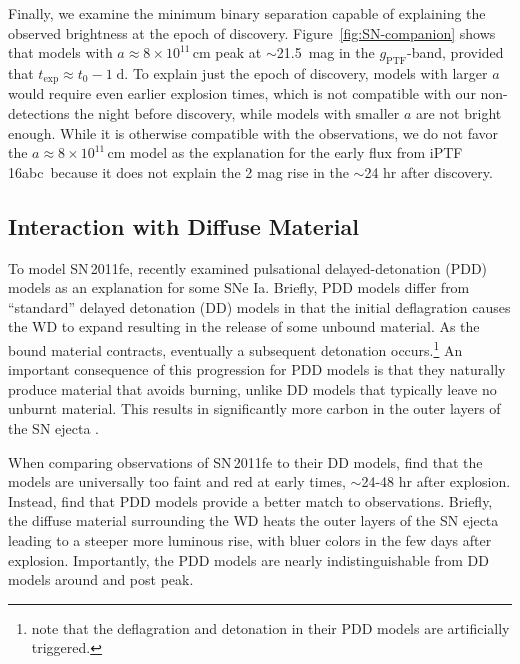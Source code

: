 \documentclass[twocolumn]{aastex61}
\newcommand{\abc}{iPTF\,16abc}
\begin{document}
Finally, we examine the minimum binary separation capable of explaining the observed brightness at the epoch of discovery. Figure~\ref{fig:SN-companion} shows that models with $a \approx 8 \times 10^{11} \, \mathrm{cm}$ peak at $\sim$21.5~mag in the $g_\mathrm{PTF}$-band, provided that $t_\mathrm{exp} \approx t_0 - 1 \; \mathrm{d}$. To explain just the epoch of discovery, models with larger $a$ would require even earlier explosion times, which is not compatible with our non-detections the night before discovery, while models with smaller $a$ are not bright enough. While it is otherwise compatible with the observations, we do not favor the $a \approx 8 \times 10^{11} \, \mathrm{cm}$ model as the explanation for the early flux from \abc\ because it does not explain the 2 mag rise in the $\sim$24 hr after discovery. 

\subsection{Interaction with Diffuse Material}

To model SN\,2011fe, \citet{2014MNRAS.441..532D} recently examined pulsational delayed-detonation (PDD) models as an explanation for some SNe Ia. Briefly, PDD models differ from ``standard'' delayed detonation (DD) models in that the initial deflagration causes the WD to expand resulting in the release of some unbound material. As the bound material contracts, eventually a subsequent detonation occurs.\footnote{\citet{2014MNRAS.441..532D} note that the deflagration and detonation in their PDD models are artificially triggered.} An important consequence of this progression for PDD models is that they naturally produce material that avoids burning, unlike DD models that typically leave no unburnt material. This results in significantly more carbon in the outer layers of the SN ejecta \citep{2014MNRAS.441..532D}.

When comparing observations of SN\,2011fe to their DD models, \citet{2014MNRAS.441..532D} find that the models are universally too faint and red at early times, $\sim$24-48 hr after explosion.  Instead, \citet{2014MNRAS.441..532D} find that PDD models provide a better match to observations. Briefly, the diffuse material surrounding the WD heats the outer layers of the SN ejecta leading to a steeper more luminous rise, with bluer colors in the few days after explosion. Importantly, the PDD models are nearly indistinguishable from DD models around and post peak. 
\end{document}
